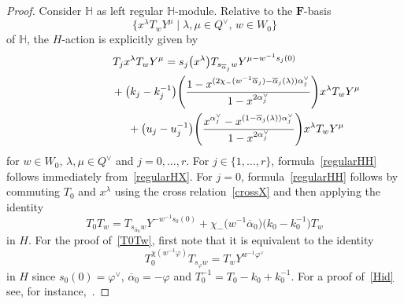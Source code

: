 \documentclass[pdftex]{sigma}
\numberwithin{equation}{section}
\begin{document}
\begin{proof}
Consider $\mathbb{H}$ as left regular $\mathbb{H}$-module.
Relative
to the $\mathbf{F}$-basis
\[
\bigl\{x^\lambda T_w Y^\mu\mid \lambda,\mu\in Q^\vee,\, w\in W_0\bigr\}
\]
of $\mathbb{H}$, the $H$-action is explicitly given by
\begin{gather}
T_jx^\lambda T_wY^\mu=s_j\bigl(x^\lambda\bigr)T_{s_{\overline{\alpha}_j}w}Y^{\mu-w^{-1}s_j(0)} \nonumber\\
\hphantom{T_jx^\lambda T_wY^\mu=}{}
+\big(k_j-k_j^{-1}\big)\Biggl(\frac{1-x^{(2\chi_-(w^{-1}\overline{\alpha}_j)-\overline{\alpha}_j(\lambda))\alpha_j^\vee}}{1-x^{2\alpha_j^\vee}}\Biggr)x^\lambda T_wY^\mu\nonumber\\
\hphantom{T_jx^\lambda T_wY^\mu=}{}
+\big(u_j-u_j^{-1}\big)\Biggl(\frac{x^{\alpha_j^\vee}-x^{(1-\overline{\alpha}_j(\lambda))\alpha_j^\vee}}{1-x^{2\alpha_j^\vee}}\Biggr)x^\lambda T_w Y^\mu\label{regularHH}
\end{gather}
for $w\in W_0$, $\lambda,\mu\in Q^\vee$ and $j=0,\dots,r$. For $j\in\{1,\dots,r\}$, formula~\eqref{regularHH} follows immediately from~\eqref{regularHX}.
For $j=0$, formula~\eqref{regularHH} follows by commuting $T_0$ and $x^\lambda$ using the cross relation~\eqref{crossX} and then applying
the identity
\begin{equation}\label{T0Tw}
T_0T_w=T_{s_{\overline{\alpha}_0}w}Y^{-w^{-1}s_0(0)}+\chi_-\bigl(w^{-1}\overline{\alpha}_0\bigr)\bigl(k_0-k_0^{-1}\bigr)T_w
\end{equation}
in $H$. For the proof of~\eqref{T0Tw}, first note that it is equivalent to the identity
\begin{equation}\label{Hid}
T_0^{\chi(w^{-1}\varphi)}T_{s_\varphi w}=T_wY^{w^{-1}\varphi^\vee}
\end{equation}
in $H$ since $s_0(0)=\varphi^\vee$, $\overline{\alpha}_0=-\varphi$ and $T_0^{-1}=T_0-k_0+k_0^{-1}$.
For a proof of~\eqref{Hid} see, for instance,~\cite[(3.3.6)]{Ma}.


\end{proof}
\end{document}
